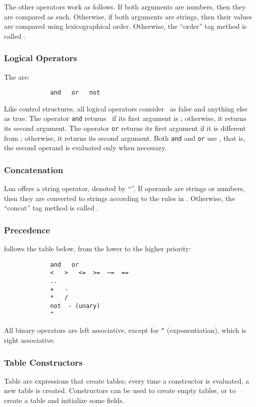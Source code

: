The other operators work as follows.
If both arguments are numbers, then they are compared as such.
Otherwise, if both arguments are strings,
then their values are compared using lexicographical order.
Otherwise, the ``order'' tag method is called .

\subsubsection{Logical Operators}
The  are:
\begin{verbatim}
             and   or   not
\end{verbatim}
Like control structures, all logical operators
consider \nil\ as false and anything else as true.
The operator \verb|and| returns \nil\ if its first argument is \nil;
otherwise, it returns its second argument.
The operator \verb|or| returns its first argument
if it is different from \nil;
otherwise, it returns its second argument.
Both \verb|and| and \verb|or| use ,
that is,
the second operand is evaluated only when necessary.

\subsubsection{Concatenation}
Lua offers a string  operator,
denoted by ``''.
If operands are strings or numbers, then they are converted to
strings according to the rules in .
Otherwise, the ``concat'' tag method is called .

\subsubsection{Precedence}
 follows the table below,
from the lower to the higher priority:
\begin{verbatim}
             and   or
             <   >   <=  >=  ~=  ==
             ..
             +   -
             *   /
             not  - (unary)
             ^
\end{verbatim}
All binary operators are left associative,
except for \verb|^| (exponentiation),
which is right associative.

\subsubsection{Table Constructors} \label{tableconstructor}
Table  are expressions that create tables;
every time a constructor is evaluated, a new table is created.
Constructors can be used to create empty tables,
or to create a table and initialize some fields.

